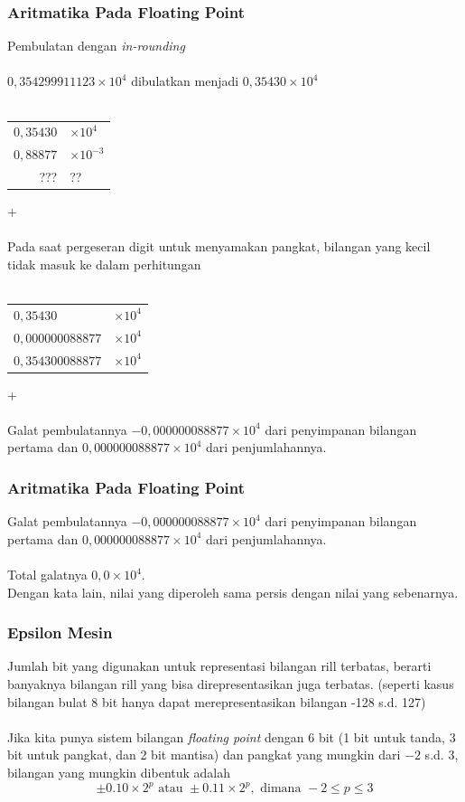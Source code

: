 \documentclass{beamer}
\begin{document}
\begin{frame}
\frametitle{Aritmatika Pada Floating Point}
Pembulatan dengan \textit{in-rounding} 
\\\ \\$0,354299911123\times10^4$ dibulatkan menjadi $0,35430\times10^4$
\\\ \\\begin{tabular}{rl}
	$0,35430$ & $\times10^4$\\
	$0,88877$ & $\times10^{-3}$\\
	\hline
	??? & ??\\
\end{tabular}+
\\\ \\Pada saat pergeseran digit untuk menyamakan pangkat, bilangan yang kecil tidak masuk ke dalam perhitungan
\\\ \\\begin{tabular}{ll}
	$0,35430$ & $\times10^4$\\
	$0,000000088877$ & $\times10^{4}$\\
	\hline
	$0,354300088877$ & $\times10^4$\\
\end{tabular}+
\\\ \\Galat pembulatannya $-0,000000088877\times10^4$ dari penyimpanan bilangan pertama dan $0,000000088877\times10^{4}$ dari penjumlahannya.
\end{frame}


\begin{frame}
\frametitle{Aritmatika Pada Floating Point}
Galat pembulatannya $-0,000000088877\times10^4$ dari penyimpanan bilangan pertama dan $0,000000088877\times10^{4}$ dari penjumlahannya.
\\\ \\Total galatnya $0,0\times 10^{4}$. 
\\Dengan kata lain, nilai yang diperoleh sama persis dengan nilai yang sebenarnya.

\end{frame}


\begin{frame}
\frametitle{Epsilon Mesin}
Jumlah bit yang digunakan untuk representasi bilangan rill terbatas, berarti banyaknya bilangan rill yang bisa direpresentasikan juga terbatas. (seperti kasus bilangan bulat 8 bit hanya dapat merepresentasikan bilangan -128 s.d. 127)
\\\ \\Jika kita punya sistem bilangan \textit{floating point} dengan 6 bit (1 bit untuk tanda, 3 bit untuk pangkat, dan 2 bit mantisa) dan pangkat yang mungkin dari $-2$ s.d. $3$, bilangan yang mungkin dibentuk adalah
\begin{equation}
\pm 0.10 \times 2^p \text{ atau } \pm 0.11 \times 2^p,\text{ dimana } -2 \leq p \leq 3
\nonumber
\end{equation}
\end{frame}
\end{document}
